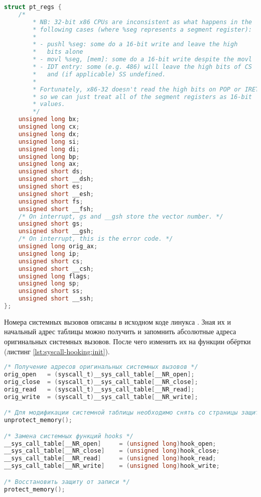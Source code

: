     \begin{lstlisting}[language=C, label=lst:syscall-hooking:pt_regs, caption=Структура регистров]
struct pt_regs {
    /*
        * NB: 32-bit x86 CPUs are inconsistent as what happens in the
        * following cases (where %seg represents a segment register):
        *
        * - pushl %seg: some do a 16-bit write and leave the high
        *   bits alone
        * - movl %seg, [mem]: some do a 16-bit write despite the movl
        * - IDT entry: some (e.g. 486) will leave the high bits of CS
        *   and (if applicable) SS undefined.
        *
        * Fortunately, x86-32 doesn't read the high bits on POP or IRET,
        * so we can just treat all of the segment registers as 16-bit
        * values.
        */
    unsigned long bx;
    unsigned long cx;
    unsigned long dx;
    unsigned long si;
    unsigned long di;
    unsigned long bp;
    unsigned long ax;
    unsigned short ds;
    unsigned short __dsh;
    unsigned short es;
    unsigned short __esh;
    unsigned short fs;
    unsigned short __fsh;
    /* On interrupt, gs and __gsh store the vector number. */
    unsigned short gs;
    unsigned short __gsh;
    /* On interrupt, this is the error code. */
    unsigned long orig_ax;
    unsigned long ip;
    unsigned short cs;
    unsigned short __csh;
    unsigned long flags;
    unsigned long sp;
    unsigned short ss;
    unsigned short __ssh;
};
    \end{lstlisting}

    Номера системных вызовов описаны в исходном коде линукса \cite{linux-nomer-syscall}.
    Зная их и начальный адрес таблицы можно получить и запомнить 
    абсолютные адреса оригинальных системных вызовов.
    После чего изменить их на функции обёртки (листинг \ref{lst:syscall-hooking:init}).

    \begin{lstlisting}[language=C, label=lst:syscall-hooking:init, caption=Модификация таблицы системных вызовов]
/* Получение адресов оригинальных системных вызовов */
orig_open   = (syscall_t)__sys_call_table[__NR_open];
orig_close  = (syscall_t)__sys_call_table[__NR_close];
orig_read   = (syscall_t)__sys_call_table[__NR_read];
orig_write  = (syscall_t)__sys_call_table[__NR_write];

/* Для модификации системной таблицы необходимо снять со страницы защиту от записи */
unprotect_memory();

/* Замена системных функций hooks */
__sys_call_table[__NR_open]     = (unsigned long)hook_open;
__sys_call_table[__NR_close]    = (unsigned long)hook_close;
__sys_call_table[__NR_read]     = (unsigned long)hook_read;
__sys_call_table[__NR_write]    = (unsigned long)hook_write;

/* Восстановить защиту от записи */
protect_memory();
    \end{lstlisting}
    
